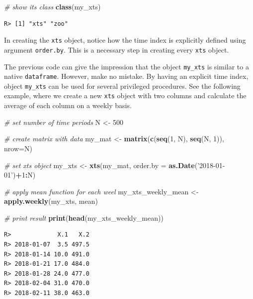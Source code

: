 \documentclass[
  12pt,
]{book}
\newenvironment{Shaded}{\begin{snugshade}}{\end{snugshade}}
\newcommand{\CommentTok}[1]{\textcolor[rgb]{0.37,0.37,0.37}{\textit{#1}}}
\newcommand{\DataTypeTok}[1]{\textcolor[rgb]{0.27,0.27,0.27}{#1}}
\newcommand{\DecValTok}[1]{\textcolor[rgb]{0.06,0.06,0.06}{#1}}
\newcommand{\KeywordTok}[1]{\textcolor[rgb]{0.27,0.27,0.27}{\textbf{#1}}}
\newcommand{\NormalTok}[1]{#1}
\newcommand{\OperatorTok}[1]{\textcolor[rgb]{0.43,0.43,0.43}{\textbf{#1}}}
\newcommand{\StringTok}[1]{\textcolor[rgb]{0.5,0.5,0.5}{#1}}
\begin{document}
\begin{Shaded}
\begin{Highlighting}[]
\CommentTok{# show its class}
\KeywordTok{class}\NormalTok{(my_xts)}
\end{Highlighting}
\end{Shaded}

\begin{verbatim}
R> [1] "xts" "zoo"
\end{verbatim}

In creating the \texttt{xts} object, notice how the time index is explicitly defined using argument \texttt{order.by}. This is a necessary step in creating every \texttt{xts} object.

The previous code can give the impression that the object \texttt{my\_xts} is similar to a native \texttt{dataframe}. However, make no mistake. By having an explicit time index, object \texttt{my\_xts} can be used for several privileged procedures. See the following example, where we create a new \texttt{xts} object with two columns and calculate the average of each column on a weekly basis.

\begin{Shaded}
\begin{Highlighting}[]
\CommentTok{# set number of time periods}
\NormalTok{N <-}\StringTok{ }\DecValTok{500}

\CommentTok{# create matrix with data}
\NormalTok{my_mat <-}\StringTok{ }\KeywordTok{matrix}\NormalTok{(}\KeywordTok{c}\NormalTok{(}\KeywordTok{seq}\NormalTok{(}\DecValTok{1}\NormalTok{, N), }\KeywordTok{seq}\NormalTok{(N, }\DecValTok{1}\NormalTok{)), }\DataTypeTok{nrow=}\NormalTok{N)}

\CommentTok{# set xts object}
\NormalTok{my_xts <-}\StringTok{ }\KeywordTok{xts}\NormalTok{(my_mat, }\DataTypeTok{order.by =} \KeywordTok{as.Date}\NormalTok{(}\StringTok{'2018-01-01'}\NormalTok{)}\OperatorTok{+}\DecValTok{1}\OperatorTok{:}\NormalTok{N)}

\CommentTok{# apply mean function for each weel}
\NormalTok{my_xts_weekly_mean <-}\StringTok{ }\KeywordTok{apply.weekly}\NormalTok{(my_xts, mean)}

\CommentTok{# print result}
\KeywordTok{print}\NormalTok{(}\KeywordTok{head}\NormalTok{(my_xts_weekly_mean))}
\end{Highlighting}
\end{Shaded}

\begin{verbatim}
R>             X.1   X.2
R> 2018-01-07  3.5 497.5
R> 2018-01-14 10.0 491.0
R> 2018-01-21 17.0 484.0
R> 2018-01-28 24.0 477.0
R> 2018-02-04 31.0 470.0
R> 2018-02-11 38.0 463.0
\end{verbatim}
\end{document}
